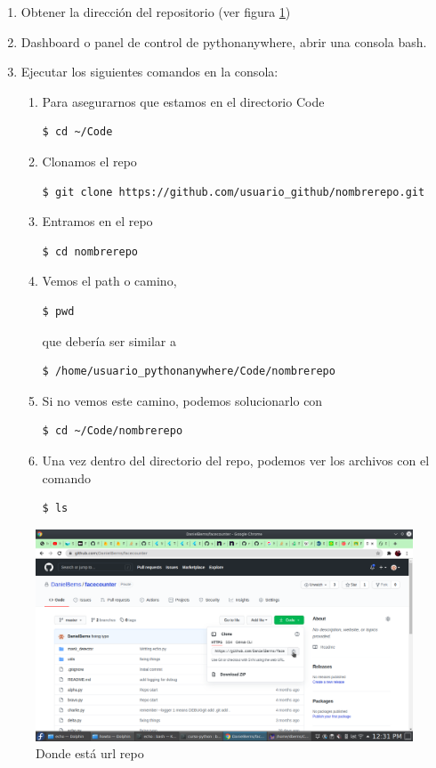 \documentclass[10pt,a4paper]{article}
\begin{document}
\begin{enumerate}
	\item Obtener la dirección del repositorio (ver figura \ref{fig:urlrepo})
    \item Dashboard o panel de control de pythonanywhere, abrir una consola bash.
	\item Ejecutar los siguientes comandos en la consola:
    \begin{enumerate}
	\item Para asegurarnos que estamos en el directorio Code
	\begin{verbatim}
$ cd ~/Code
	\end{verbatim}
	\item Clonamos el repo
	\begin{verbatim}
$ git clone https://github.com/usuario_github/nombrerepo.git
	\end{verbatim}
	\item Entramos en el repo
	\begin{verbatim}
$ cd nombrerepo
	\end{verbatim}
    \item Vemos el path o camino,
    \begin{verbatim}
$ pwd
    \end{verbatim}
    que debería ser similar a
    \begin{verbatim}
$ /home/usuario_pythonanywhere/Code/nombrerepo
    \end{verbatim}    
    \item Si no vemos este camino, podemos solucionarlo con
    \begin{verbatim}
$ cd ~/Code/nombrerepo
    \end{verbatim}
    \item Una vez dentro del directorio del repo, podemos ver los archivos con el comando
    \begin{verbatim}
$ ls
    \end{verbatim}
    \end{enumerate}
\end{enumerate}

\begin{figure}
	\centering
	\includegraphics[width=1\linewidth]{sc/url_repo}
	\caption{Donde está url repo}
	\label{fig:urlrepo}
\end{figure}
\end{document}
